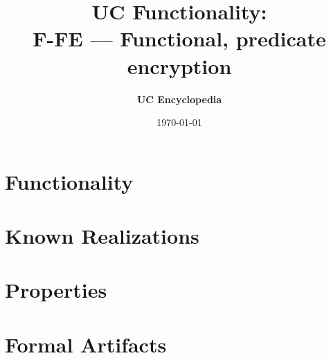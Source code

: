 \documentclass[11pt,a4paper]{article}
\title{\textbf{\Large UC Functionality:}\\[0.2em] \Large F-FE --- Functional, predicate encryption}
\author{\textbf{UC Encyclopedia}}
\date{\today}
\newtheorem{functionality}{Functionality}
\begin{document}
\maketitle

\begin{abstract}
\end{abstract}

\section{Functionality}

%

\section{Known Realizations}


\section{Properties}


\section{Formal Artifacts}

\end{document}
